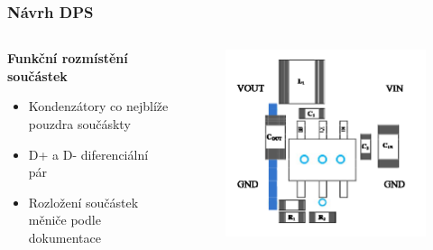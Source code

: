 \documentclass[%
  12pt,       				%
	t,                  %
	aspectratio=1610,   %
	unicode,						%
]{beamer}				    	%
\begin{document}
\begin{frame} 
	\frametitle{Návrh DPS}
		\begin{columns}[T] 	
		\begin{column}{0.5\textwidth}		%
			\vspace{0.5cm}
			\textbf{Funkční rozmístění součástek}
			\begin{itemize}
				\item Kondenzátory co nejblíže pouzdra součáskty
				\item D+ a D- diferenciální pár
				\item Rozložení součástek měniče podle dokumentace
			\end{itemize}
		\end{column}
		\begin{column}{0.5\textwidth}		%
			\begin{figure}%
				\centering
				\includegraphics[width=1\columnwidth]{obrazky/SY8105_rozlozeni_na_DPS.png}
			\end{figure}%
		\end{column}
	\end{columns}
\end{frame}

\end{document}
